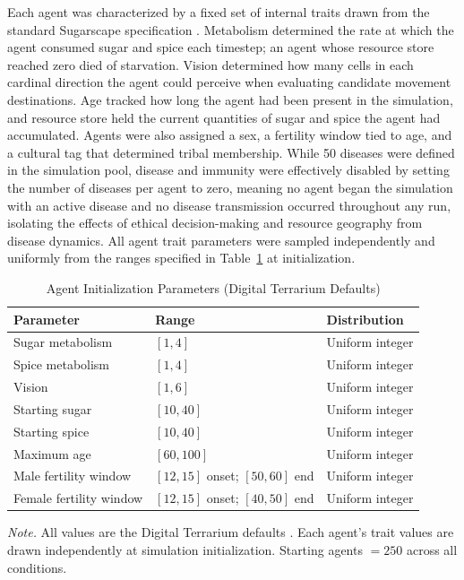 \documentclass{icsthesis}
\begin{document}
\begin{mainmatter}
			Each agent was characterized by a fixed set of internal traits drawn from the standard Sugarscape specification \citep{Kehoe2015,KremerHerman2024}. Metabolism determined the rate at which the agent consumed sugar and spice each timestep; an agent whose resource store reached zero died of starvation. Vision determined how many cells in each cardinal direction the agent could perceive when evaluating candidate movement destinations. Age tracked how long the agent had been present in the simulation, and resource store held the current quantities of sugar and spice the agent had accumulated. Agents were also assigned a sex, a fertility window tied to age, and a cultural tag that determined tribal membership. While 50 diseases were defined in the simulation pool, disease and immunity were effectively disabled by setting the number of diseases per agent to zero, meaning no agent began the simulation with an active disease and no disease transmission occurred throughout any run, isolating the effects of ethical decision-making and resource geography from disease dynamics. All agent trait parameters were sampled independently and uniformly from the ranges specified in Table~\ref{table:agent-params} at initialization.

			\begin{table}[H]
			\vspace{2ex}
			\centering
			\caption{Agent Initialization Parameters (Digital Terrarium Defaults)}
			\label{table:agent-params}
			\footnotesize
			\renewcommand{\arraystretch}{1.3}
			\begin{tabular}{l l l}
			\hline\hline
			\textbf{Parameter} & \textbf{Range} & \textbf{Distribution} \\
			\hline
			Sugar metabolism       & $[1, 4]$   & Uniform integer \\
			Spice metabolism       & $[1, 4]$   & Uniform integer \\
			Vision                 & $[1, 6]$   & Uniform integer \\
			Starting sugar         & $[10, 40]$ & Uniform integer \\
			Starting spice         & $[10, 40]$ & Uniform integer \\
			Maximum age            & $[60, 100]$ & Uniform integer \\
			Male fertility window  & $[12, 15]$ onset; $[50, 60]$ end & Uniform integer \\
			Female fertility window & $[12, 15]$ onset; $[40, 50]$ end & Uniform integer \\
			\hline
			\end{tabular}
			\par\smallskip
			{\footnotesize\noindent\textit{Note.} All values are the Digital Terrarium defaults \citep{Kehoe2015,KremerHerman2024}. Each agent's trait values are drawn independently at simulation initialization. Starting agents $= 250$ across all conditions.}
			\end{table}


\end{mainmatter}
\end{document}
